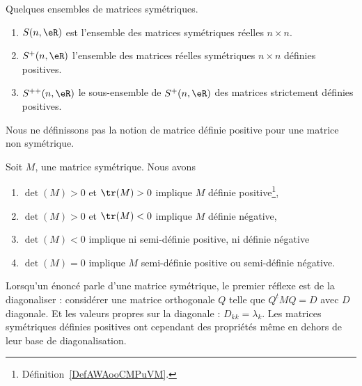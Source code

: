 \begin{normaltext}      \label{NORMooAJLHooQhwpvr}
    Quelques ensembles de matrices symétriques.
    \begin{enumerate}
        \item
            \( S(n,\eR)\) est l'ensemble des matrices symétriques réelles \( n\times n\).
        \item
            \( S^+(n,\eR)\) l'ensemble des matrices réelles symétriques \( n\times n\) définies positives.
        \item
            \( S^{++}(n,\eR)\) le sous-ensemble de \( S^+(n,\eR)\) des matrices strictement définies positives.
    \end{enumerate}
\end{normaltext}

\begin{remark}
	Nous ne définissons pas la notion de matrice définie positive pour une matrice non symétrique.
\end{remark}

\begin{proposition}     \label{PropcnJyXZ}
	Soit \( M\), une matrice symétrique. Nous avons
	\begin{enumerate}
		\item       \label{ITEMooTJVQooYmRkas}
		      \( \det(M)>0\) et \( \tr(M)>0\) implique \( M\) définie positive\footnote{Définition~\ref{DefAWAooCMPuVM}.},
		\item
		      \( \det(M)>0\) et \( \tr(M)<0\) implique \( M\) définie négative,
		\item       \label{ItemluuFPN}
		      \( \det(M)<0\) implique ni semi-définie positive, ni définie négative
		\item
		      \( \det(M)=0\) implique \( M\) semi-définie positive ou semi-définie négative.
	\end{enumerate}
\end{proposition}

Lorsqu'un énoncé parle d'une matrice symétrique, le premier réflexe est de la diagonaliser : considérer une matrice orthogonale \( Q\) telle que \( Q^tMQ=D\) avec \( D\) diagonale. Et les valeurs propres sur la diagonale : \( D_{kk}=\lambda_k\). Les matrices symétriques définies positives ont cependant des propriétés même en dehors de leur base de diagonalisation.

